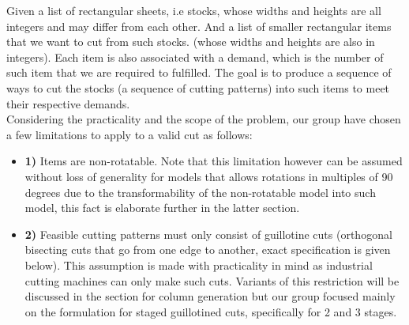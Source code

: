 \documentclass[a4paper]{article}
\begin{document}
    Given a list of rectangular sheets, i.e stocks, 
    whose widths and heights are all integers and may differ from each other.
    And a list of smaller rectangular items that we want to cut from such stocks.
    (whose widths and heights are also in integers). 
    Each item is also associated with a demand, which is the number of such item that we are required to fulfilled.
    The goal is to produce a sequence of ways to cut the stocks (a sequence of cutting patterns) into such items to meet their respective demands.
    \vspace{0.2cm}\\
    Considering the practicality and the scope of the problem, our group have chosen a few limitations to apply to a valid cut as follows:
    \begin{itemize}
        \item \textbf{1)} Items are non-rotatable. 
        Note that this limitation however can be assumed without loss of generality for models that allows rotations in multiples of 90 degrees due to the transformability of the non-rotatable model into such model, this fact is elaborate further in the latter section.
        \item \textbf{2)} Feasible cutting patterns must only consist of guillotine cuts (orthogonal bisecting cuts that go from one edge to another, exact specification is given below).
        This assumption is made with practicality in mind as industrial cutting machines can only make such cuts. 
        Variants of this restriction will be discussed in the section for column generation but our group focused mainly on the formulation for staged guillotined cuts, specifically for 2 and 3 stages. 
    \end{itemize}
\end{document}
